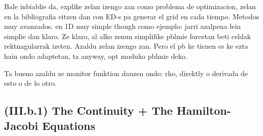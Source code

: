 \documentclass[11pt, a4paper]{article} %
\begin{document}
Bale inbiablie da, explike zelan izengo zan como problema de optimizacion, zelan en la bibliografia eitzen dan con ED-s pa generar el grid en cada tiempo. Metodos muy avanzados. en 1D muy simple though como ejemplo: jarri azalpena lein simplie dan klaro. Ze klaro, al alko zenun simplifike pblmie forcetan beti celdak rektnagularrak izeten. Azaldu zelan izengo zan. Pero el pb ke tienen es ke ezta hain ondo adaptetan, ta anyway, opt moduko pblmie deko.

Ta bueno azaldu ze monitor funktion dauzen ondo: rho, direktly o derivada de esto o de lo otro.






\subsection*{(III.b.1) The Continuity + The Hamilton-Jacobi Equations}
\end{document}
